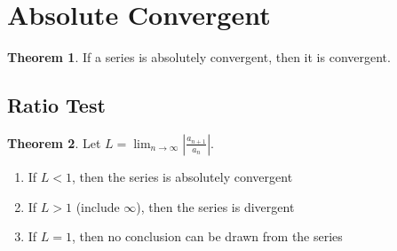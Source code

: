 \documentclass{article}
\theoremstyle{definition}
\newtheorem{theorem}{Theorem}[section]
\theoremstyle{remark}
\begin{document}
\section{Absolute Convergent}

\begin{theorem}
    If a series is absolutely convergent, then it is convergent.
\end{theorem}

\subsection{Ratio Test}

\begin{theorem}
Let $L=\lim_{n\rightarrow \infty}|\frac{a_{n+1}}{a_n}|$.
    \begin{enumerate}
        \item If $L<1$, then the series is absolutely convergent
        \item If $L>1$ (include $\infty$), then the series is divergent
        \item If $L=1$, then no conclusion can be drawn from the series
    \end{enumerate}
\end{theorem}
\end{document}
